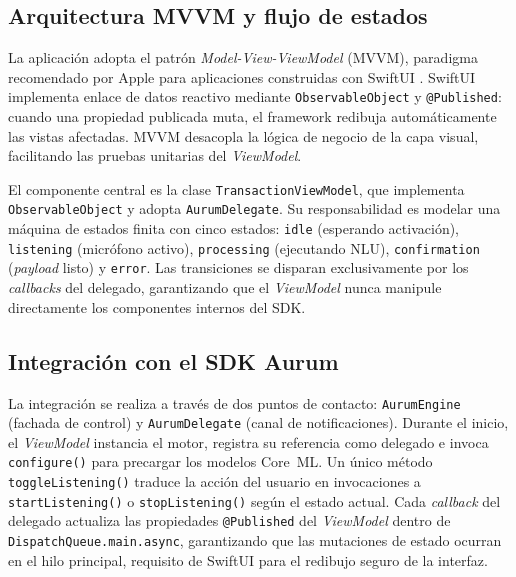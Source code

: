 \subsection{Arquitectura MVVM y flujo de estados}

La aplicación adopta el patrón \textit{Model-View-ViewModel} (MVVM), paradigma recomendado por Apple para aplicaciones construidas con SwiftUI \citep{apple-swiftui}. SwiftUI implementa enlace de datos reactivo mediante \texttt{Observable\allowbreak{}Object} y \texttt{@Published}: cuando una propiedad publicada muta, el framework redibuja automáticamente las vistas afectadas. MVVM desacopla la lógica de negocio de la capa visual, facilitando las pruebas unitarias del \textit{ViewModel}.

El componente central es la clase \texttt{Transaction\allowbreak{}View\allowbreak{}Model}, que implementa \texttt{Observable\allowbreak{}Object} y adopta \texttt{Aurum\allowbreak{}Delegate}. Su responsabilidad es modelar una máquina de estados finita con cinco estados: \texttt{idle} (esperando activación), \texttt{listening} (micrófono activo), \texttt{processing} (ejecutando NLU), \texttt{confirmation} (\textit{payload} listo) y \texttt{error}. Las transiciones se disparan exclusivamente por los \textit{callbacks} del delegado, garantizando que el \textit{ViewModel} nunca manipule directamente los componentes internos del SDK.

\subsection{Integración con el SDK Aurum}

La integración se realiza a través de dos puntos de contacto: \texttt{Aurum\allowbreak{}Engine} (fachada de control) y \texttt{Aurum\allowbreak{}Delegate} (canal de notificaciones). Durante el inicio, el \textit{ViewModel} instancia el motor, registra su referencia como delegado e invoca \texttt{configure()} para precargar los modelos Core~ML. Un único método \texttt{toggleListe\allowbreak{}ning()} traduce la acción del usuario en invocaciones a \texttt{startListe\allowbreak{}ning()} o \texttt{stop\allowbreak{}Listen\-ing()} según el estado actual. Cada \textit{callback} del delegado actualiza las propiedades \texttt{@Pub\-lished} del \textit{ViewModel} dentro de \texttt{Dispatch\allowbreak{}Queue.\allowbreak{}main.\allowbreak{}async}, garantizando que las mutaciones de estado ocurran en el hilo principal, requisito de SwiftUI para el redibujo seguro de la interfaz.

